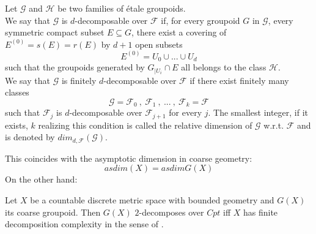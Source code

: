 \begin{definition}
Let $\mathcal G$ and $\mathcal H$ be two families of \'etale groupoids. \\

We say that $\mathcal G$ is $d$-decomposable over $\mathcal F$ if, for every groupoid $G$ in $\mathcal G$, every symmetric compact subset $E\subseteq G$, there exist a covering of $E^{(0)} = s(E)=r(E)$ by $d+1$ open subsets 
\[E^{(0)} = U_0 \cup ... \cup U_d \] such that the groupoids generated by $G_{|U_i} \cap E$ all belongs to the class $\mathcal H$.\\

We say that $\mathcal G$ is finitely $d$-decomposable over $\mathcal F$ if there exist finitely many classes 
\[\mathcal G= \mathcal F_0 \ , \ \mathcal F_1 \ , \ ... \ , \ \mathcal F_k = \mathcal F \] 
such that $\mathcal F_j$ is $d$-decomposable over $\mathcal F_{j+1}$ for every $j$. The smallest integer, if it exists, $k$ realizing this condition is called the relative dimension of $\mathcal G$ w.r.t. $\mathcal F$ and is denoted by $dim_{d,\mathcal F}(\mathcal G)$. 
\end{definition}

This coincides with the asymptotic dimension in coarse geometry: \[asdim(X)= asdim G(X)\]
On the other hand: 

\begin{prop}
Let $X$ be a countable discrete metric space with bounded geometry and $G(X)$ its coarse groupoid. Then $G(X)$ $2$-decomposes over $Cpt$ iff $X$ has finite decomposition complexity in the sense of \cite{GuentnerTesseraYu}.
\end{prop}

